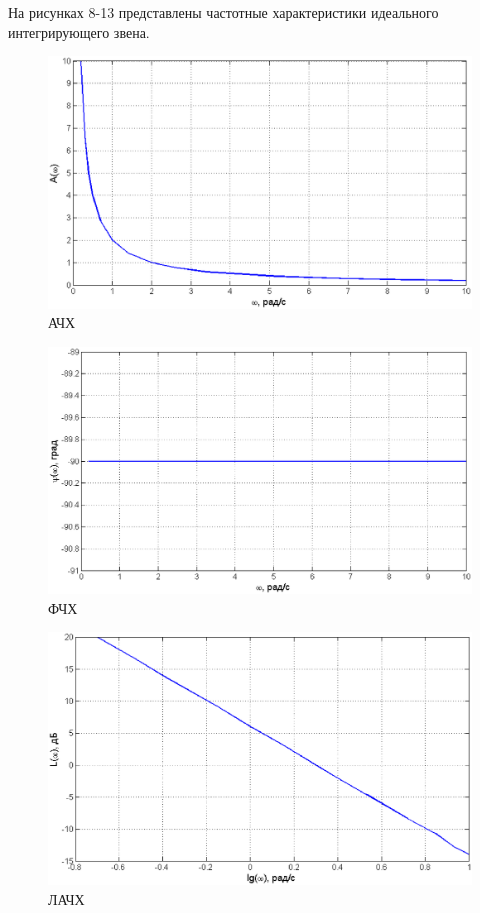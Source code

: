 \documentclass[12pt,a4paper]{article}
\begin{document}
На рисунках 8-13 представлены частотные характеристики идеального интегрирующего звена.
\begin{figure}[H]
	\centering
	\includegraphics[width=1\linewidth]{ACHH2.eps}
	\caption{АЧХ}
\end{figure}
\begin{figure}[H]
	\centering
	\includegraphics[width=1\linewidth]{FCHH2.eps}
	\caption{ФЧХ}
\end{figure}
\begin{figure}[H]
	\centering
	\includegraphics[width=1\linewidth]{LACHH2.eps}
	\caption{ЛАЧХ}
\end{figure}
\end{document}
